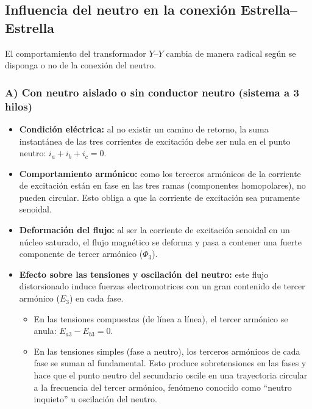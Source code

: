 \documentclass[12pt]{article}
\begin{document}
\subsection{Influencia del neutro en la conexi\'on Estrella--Estrella}

El comportamiento del transformador $Y$--$Y$ cambia de manera radical seg\'un se disponga o no de la conexi\'on del neutro.

\subsubsection*{A) Con neutro aislado o sin conductor neutro (sistema a 3 hilos)}
\begin{itemize}
    \item \textbf{Condici\'on el\'ectrica:} al no existir un camino de retorno, la suma instant\'anea de las tres corrientes de excitaci\'on debe ser nula en el punto neutro: $i_a+i_b+i_c=0$.
    \item \textbf{Comportamiento arm\'onico:} como los terceros arm\'onicos de la corriente de excitaci\'on est\'an en fase en las tres ramas (componentes homopolares), no pueden circular. Esto obliga a que la corriente de excitaci\'on sea puramente senoidal.
    \item \textbf{Deformaci\'on del flujo:} al ser la corriente de excitaci\'on senoidal en un n\'ucleo saturado, el flujo magn\'etico se deforma y pasa a contener una fuerte componente de tercer arm\'onico ($\Phi_3$).
    \item \textbf{Efecto sobre las tensiones y oscilaci\'on del neutro:} este flujo distorsionado induce fuerzas electromotrices con un gran contenido de tercer arm\'onico ($E_3$) en cada fase.
    \begin{itemize}
        \item En las tensiones compuestas (de l\'inea a l\'inea), el tercer arm\'onico se anula: $E_{a3}-E_{b3}=0$.
        \item En las tensiones simples (fase a neutro), los terceros arm\'onicos de cada fase se suman al fundamental. Esto produce sobretensiones en las fases y hace que el punto neutro del secundario oscile en una trayectoria circular a la frecuencia del tercer arm\'onico, fen\'omeno conocido como ``neutro inquieto'' u oscilaci\'on del neutro.
    \end{itemize}
\end{itemize}
\end{document}
